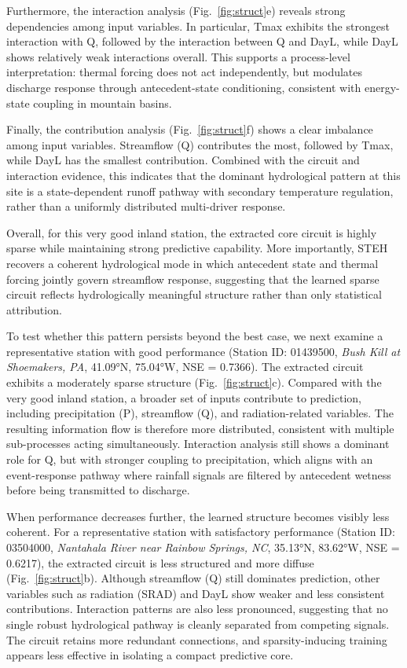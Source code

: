 Furthermore, the interaction analysis (Fig.~\ref{fig:struct}e) reveals strong dependencies among input variables. In particular, Tmax exhibits the strongest interaction with Q, followed by the interaction between Q and DayL, while DayL shows relatively weak interactions overall. This supports a process-level interpretation: thermal forcing does not act independently, but modulates discharge response through antecedent-state conditioning, consistent with energy-state coupling in mountain basins\cite{WRR_shap}.

Finally, the contribution analysis (Fig.~\ref{fig:struct}f) shows a clear imbalance among input variables. Streamflow (Q) contributes the most, followed by Tmax, while DayL has the smallest contribution. Combined with the circuit and interaction evidence, this indicates that the dominant hydrological pattern at this site is a state-dependent runoff pathway with secondary temperature regulation, rather than a uniformly distributed multi-driver response.

\FloatBarrier

Overall, for this very good inland station, the extracted core circuit is highly sparse while maintaining strong predictive capability\cite{7552539}. More importantly, STEH recovers a coherent hydrological mode in which antecedent state and thermal forcing jointly govern streamflow response, suggesting that the learned sparse circuit reflects hydrologically meaningful structure rather than only statistical attribution.

To test whether this pattern persists beyond the best case, we next examine a representative station with good performance (Station ID: 01439500, \textit{Bush Kill at Shoemakers, PA}, 41.09°N, 75.04°W, NSE = 0.7366). The extracted circuit exhibits a moderately sparse structure (Fig.~\ref{fig:struct}c). Compared with the very good inland station, a broader set of inputs contribute to prediction, including precipitation (P), streamflow (Q), and radiation-related variables. The resulting information flow is therefore more distributed\cite{wang2022interpretabilitywildcircuitindirect}, consistent with multiple sub-processes acting simultaneously. Interaction analysis still shows a dominant role for Q, but with stronger coupling to precipitation, which aligns with an event-response pathway where rainfall signals are filtered by antecedent wetness before being transmitted to discharge\cite{BURN2023129075}.

When performance decreases further, the learned structure becomes visibly less coherent. For a representative station with satisfactory performance (Station ID: 03504000, \textit{Nantahala River near Rainbow Springs, NC}, 35.13°N, 83.62°W, NSE = 0.6217), the extracted circuit is less structured and more diffuse (Fig.~\ref{fig:struct}b). Although streamflow (Q) still dominates prediction, other variables such as radiation (SRAD) and DayL show weaker and less consistent contributions. Interaction patterns are also less pronounced, suggesting that no single robust hydrological pathway is cleanly separated from competing signals. The circuit retains more redundant connections, and sparsity-inducing training appears less effective in isolating a compact predictive core\cite{openai_weight_sparse_transformers}.

